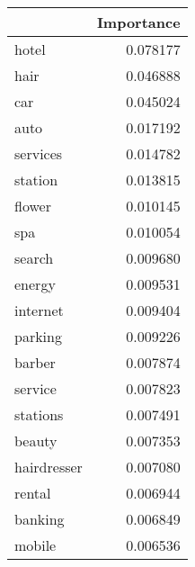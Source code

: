 \begin{tabular}{lr}
\toprule
{} &  Importance \\
\midrule
hotel       &    0.078177 \\
hair        &    0.046888 \\
car         &    0.045024 \\
auto        &    0.017192 \\
services    &    0.014782 \\
station     &    0.013815 \\
flower      &    0.010145 \\
spa         &    0.010054 \\
search      &    0.009680 \\
energy      &    0.009531 \\
internet    &    0.009404 \\
parking     &    0.009226 \\
barber      &    0.007874 \\
service     &    0.007823 \\
stations    &    0.007491 \\
beauty      &    0.007353 \\
hairdresser &    0.007080 \\
rental      &    0.006944 \\
banking     &    0.006849 \\
mobile      &    0.006536 \\
\bottomrule
\end{tabular}

